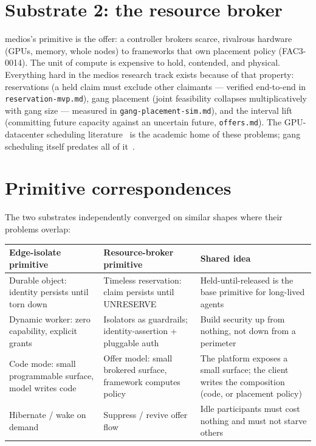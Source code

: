 \documentclass[11pt]{article}
\newcommand{\code}[1]{\texttt{#1}}
\begin{document}
\section{Substrate 2: the resource broker}

medios's primitive is the offer: a controller brokers scarce, rivalrous
hardware (GPUs, memory, whole nodes) to frameworks that own placement
policy (FAC3-0014). The unit of compute is expensive to hold, contended,
and physical. Everything hard in the medios research track exists because
of that property: reservations (a held claim must exclude other claimants
--- verified end-to-end in \code{reservation-mvp.md}), gang placement
(joint feasibility collapses multiplicatively with gang size --- measured
in \code{gang-placement-sim.md}), and the interval lift (committing future
capacity against an uncertain future, \code{offers.md}). The GPU-datacenter
scheduling literature~\cite{gpusurvey,pollux} is the academic home of these
problems; gang scheduling itself predates all of it~\cite{ousterhout}.

\section{Primitive correspondences}

The two substrates independently converged on similar shapes where their
problems overlap:

\begin{center}
\small
\begin{tabular}{>{\raggedright\arraybackslash}p{}>{\raggedright\arraybackslash}p{}>{\raggedright\arraybackslash}p{}}
\toprule
Edge-isolate primitive & Resource-broker primitive & Shared idea \\
\midrule
Durable object: identity persists until torn down &
Timeless reservation: claim persists until UNRESERVE &
Held-until-released is the base primitive for long-lived agents \\
\addlinespace
Dynamic worker: zero capability, explicit grants &
Isolators as guardrails; identity-assertion + pluggable auth &
Build security up from nothing, not down from a perimeter \\
\addlinespace
Code mode: small programmable surface, model writes code &
Offer model: small brokered surface, framework computes policy &
The platform exposes a small surface; the client writes the composition
(code, or placement policy) \\
\addlinespace
Hibernate / wake on demand &
Suppress / revive offer flow &
Idle participants must cost nothing and must not starve others \\
\bottomrule
\end{tabular}
\end{center}
\end{document}
